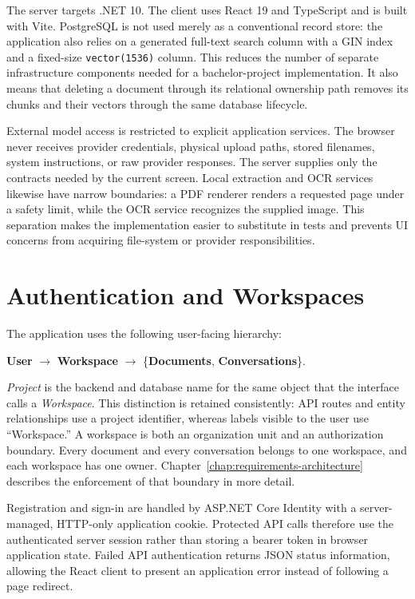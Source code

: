 The server targets .NET 10. The client uses React 19 and TypeScript and is built with Vite. PostgreSQL is not used merely as a conventional record store: the application also relies on a generated full-text search column with a GIN index and a fixed-size \texttt{vector(1536)} column. This reduces the number of separate infrastructure components needed for a bachelor-project implementation. It also means that deleting a document through its relational ownership path removes its chunks and their vectors through the same database lifecycle.

External model access is restricted to explicit application services. The browser never receives provider credentials, physical upload paths, stored filenames, system instructions, or raw provider responses. The server supplies only the contracts needed by the current screen. Local extraction and OCR services likewise have narrow boundaries: a PDF renderer renders a requested page under a safety limit, while the OCR service recognizes the supplied image. This separation makes the implementation easier to substitute in tests and prevents UI concerns from acquiring file-system or provider responsibilities.

\clearpage
\section{Authentication and Workspaces}
\label{sec:authentication-workspaces}

The application uses the following user-facing hierarchy:

\begin{center}
\textbf{User} $\rightarrow$ \textbf{Workspace} $\rightarrow$ \{\textbf{Documents}, \textbf{Conversations}\}.
\end{center}

\emph{Project} is the backend and database name for the same object that the interface calls a \emph{Workspace}. This distinction is retained consistently: API routes and entity relationships use a project identifier, whereas labels visible to the user use ``Workspace.'' A workspace is both an organization unit and an authorization boundary. Every document and every conversation belongs to one workspace, and each workspace has one owner. Chapter~\ref{chap:requirements-architecture} describes the enforcement of that boundary in more detail.

Registration and sign-in are handled by ASP.NET Core Identity with a server-managed, HTTP-only application cookie. Protected API calls therefore use the authenticated server session rather than storing a bearer token in browser application state. Failed API authentication returns JSON status information, allowing the React client to present an application error instead of following a page redirect.

